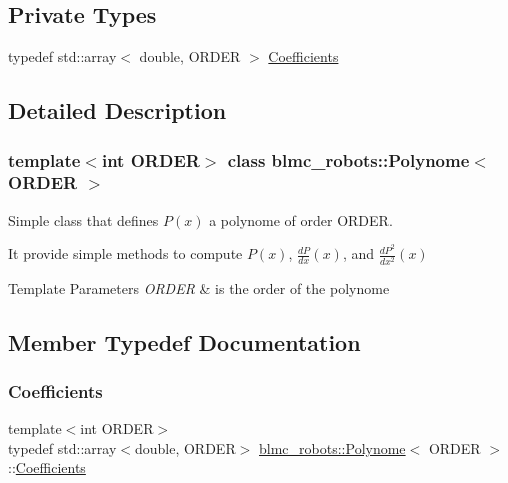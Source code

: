 \subsection*{Private Types}
\begin{DoxyCompactItemize}
\item 
typedef std\+::array$<$ double, O\+R\+D\+ER $>$ \hyperlink{classblmc__robots_1_1Polynome_a31e086184f3934b269e8318cce2859eb}{Coefficients}
\end{DoxyCompactItemize}


\subsection{Detailed Description}
\subsubsection*{template$<$int O\+R\+D\+ER$>$\newline
class blmc\+\_\+robots\+::\+Polynome$<$ O\+R\+D\+E\+R $>$}

Simple class that defines $ P(x) $ a polynome of order O\+R\+D\+ER. 

It provide simple methods to compute $ P(x) $, $ \frac{dP}{dx}(x) $, and $ \frac{dP^2}{dx^2}(x) $


\begin{DoxyTemplParams}{Template Parameters}
{\em O\+R\+D\+ER} & is the order of the polynome \\
\hline
\end{DoxyTemplParams}


\subsection{Member Typedef Documentation}
\mbox{\label{classblmc__robots_1_1Polynome_a31e086184f3934b269e8318cce2859eb}} 
\subsubsection{\texorpdfstring{Coefficients}{Coefficients}}
{\footnotesize\ttfamily template$<$int O\+R\+D\+ER$>$ \\
typedef std\+::array$<$double, O\+R\+D\+ER$>$ \hyperlink{classblmc__robots_1_1Polynome}{blmc\+\_\+robots\+::\+Polynome}$<$ O\+R\+D\+ER $>$\+::\hyperlink{classblmc__robots_1_1Polynome_a31e086184f3934b269e8318cce2859eb}{Coefficients}\hspace{0.3cm}{\ttfamily [private]}}

